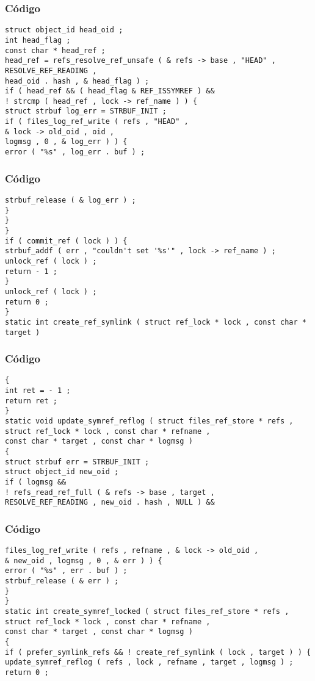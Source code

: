 \documentclass{beamer}
\begin{document}
\begin{frame}[fragile]
\frametitle{C\'odigo}
\begin{verbatim}
struct object_id head_oid ; 
int head_flag ; 
const char * head_ref ; 
head_ref = refs_resolve_ref_unsafe ( & refs -> base , "HEAD" , 
RESOLVE_REF_READING , 
head_oid . hash , & head_flag ) ; 
if ( head_ref && ( head_flag & REF_ISSYMREF ) && 
! strcmp ( head_ref , lock -> ref_name ) ) { 
struct strbuf log_err = STRBUF_INIT ; 
if ( files_log_ref_write ( refs , "HEAD" , 
& lock -> old_oid , oid , 
logmsg , 0 , & log_err ) ) { 
error ( "%s" , log_err . buf ) ; 
\end{verbatim}
\end{frame}
\begin{frame}[fragile]
\frametitle{C\'odigo}
\begin{verbatim}
strbuf_release ( & log_err ) ; 
} 
} 
} 
if ( commit_ref ( lock ) ) { 
strbuf_addf ( err , "couldn't set '%s'" , lock -> ref_name ) ; 
unlock_ref ( lock ) ; 
return - 1 ; 
} 
unlock_ref ( lock ) ; 
return 0 ; 
} 
static int create_ref_symlink ( struct ref_lock * lock , const char * target ) 
\end{verbatim}
\end{frame}
\begin{frame}[fragile]
\frametitle{C\'odigo}
\begin{verbatim}
{ 
int ret = - 1 ; 
return ret ; 
} 
static void update_symref_reflog ( struct files_ref_store * refs , 
struct ref_lock * lock , const char * refname , 
const char * target , const char * logmsg ) 
{ 
struct strbuf err = STRBUF_INIT ; 
struct object_id new_oid ; 
if ( logmsg && 
! refs_read_ref_full ( & refs -> base , target , 
RESOLVE_REF_READING , new_oid . hash , NULL ) && 
\end{verbatim}
\end{frame}
\begin{frame}[fragile]
\frametitle{C\'odigo}
\begin{verbatim}
files_log_ref_write ( refs , refname , & lock -> old_oid , 
& new_oid , logmsg , 0 , & err ) ) { 
error ( "%s" , err . buf ) ; 
strbuf_release ( & err ) ; 
} 
} 
static int create_symref_locked ( struct files_ref_store * refs , 
struct ref_lock * lock , const char * refname , 
const char * target , const char * logmsg ) 
{ 
if ( prefer_symlink_refs && ! create_ref_symlink ( lock , target ) ) { 
update_symref_reflog ( refs , lock , refname , target , logmsg ) ; 
return 0 ; 
\end{verbatim}
\end{frame}
\end{document}

